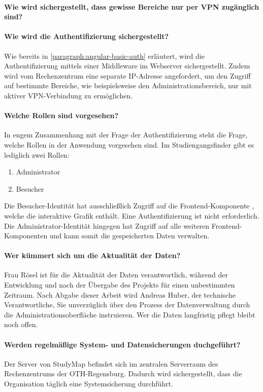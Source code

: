 \paragraph*{Wie wird sichergestellt, dass gewisse Bereiche nur per VPN zugänglich sind?}

\paragraph*{Wie wird die Authentifizierung sichergestellt?}
Wie bereits in \autoref{paragraph:angular-basic-auth} erläutert, wird die Authentifizierung mittels einer Middleware im Webserver sichergestellt. Zudem wird vom Rechenzentrum eine separate IP-Adresse angefordert, um den Zugriff auf bestimmte Bereiche, wie beispielsweise den Administrationsbereich, nur mit aktiver VPN-Verbindung zu ermöglichen. %

\paragraph*{Welche Rollen sind vorgesehen?}
In engem Zusammenhang mit der Frage der Authentifizierung steht die Frage, welche Rollen in der Anwendung vorgesehen sind. Im Studiengangsfinder gibt es lediglich zwei Rollen:
\begin{enumerate}
    \item Administrator
    \item Besucher
\end{enumerate}
Die Besucher-Identität hat ausschließlich Zugriff auf die Frontend-Komponente , welche die interaktive Grafik enthält. Eine Authentifizierung ist nicht erforderlich. Die Administrator-Identität hingegen hat Zugriff auf alle weiteren Frontend-Komponenten und kann somit die gespeicherten Daten verwalten.

\paragraph*{Wer kümmert sich um die Aktualität der Daten?}
Frau Rösel ist für die Aktualität der Daten verantwortlich, während der Entwicklung und nach der Übergabe des Projekts für einen unbestimmten Zeitraum. Nach Abgabe dieser Arbeit wird Andreas Huber, der technische Verantwortliche, Sie unverzüglich über den Prozess der Datenverwaltung durch die Administrationsoberfläche instruieren. Wer die Daten langfristig pflegt bleibt noch offen.

\paragraph*{Werden regelmäßige System- und Datensicherungen duchgeführt?}
Der Server von StudyMap befindet sich im zentralen Serverraum des Rechenzentrums der OTH-Regensburg. Dadurch wird sichergestellt, dass die Organisation täglich eine Systemsicherung durchführt.

